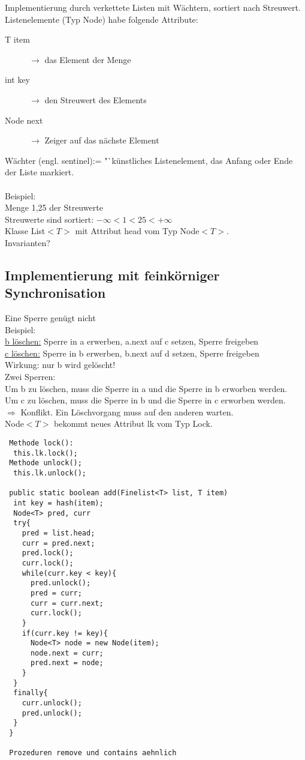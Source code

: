 \documentclass[a4paper,12pt]{scrartcl}
\begin{document}
Implementierung durch verkettete Listen mit Wächtern, sortiert nach Streuwert.\\
Listenelemente (Typ Node) habe folgende Attribute:
\begin{description}
 \item[T item] $\rightarrow$ das Element der Menge
 \item[int key] $\rightarrow$ den Streuwert des Elements
 \item[Node next] $\rightarrow$ Zeiger auf das nächste Element
\end{description}

Wächter (engl. sentinel):= "`künstliches Listenelement, das Anfang oder Ende der Liste markiert.\\
\\
Beispiel:\\
Menge {1,25} der Streuwerte\\
Streuwerte sind sortiert: $-\infty < 1 < 25 < +\infty$\\
Klasse List$<T>$ mit Attribut head vom Typ Node$<T>$.\\
Invarianten?

\subsection{Implementierung mit feinkörniger Synchronisation}

Eine Sperre genügt nicht\\
Beispiel:\\
\underline{b löschen:} Sperre in a erwerben, a.next auf c setzen, Sperre freigeben\\
\underline{c löschen:} Sperre in b erwerben, b.next auf d setzen, Sperre freigeben\\
Wirkung: nur b wird gelöscht!\\
Zwei Sperren:\\
Um b zu löschen, muss die Sperre in a und die Sperre in b erworben werden.\\
Um c zu löschen, muss die Sperre in b und die Sperre in c erworben werden.\\
$\Rightarrow$ Konflikt. Ein Löschvorgang muss auf den anderen warten.\\
Node$<T>$ bekommt neues Attribut lk vom Typ Lock.
\begin{lstlisting}
 Methode lock():
  this.lk.lock();
 Methode unlock();
  this.lk.unlock();
  
 public static boolean add(Finelist<T> list, T item)
  int key = hash(item);
  Node<T> pred, curr
  try{
    pred = list.head;
    curr = pred.next;
    pred.lock();
    curr.lock();
    while(curr.key < key){
      pred.unlock();
      pred = curr;
      curr = curr.next;
      curr.lock();
    }
    if(curr.key != key){
      Node<T> node = new Node(item);
      node.next = curr;
      pred.next = node;
    }
  }
  finally{
    curr.unlock();
    pred.unlock();    
  }
 }
 
 Prozeduren remove und contains aehnlich
 \end{lstlisting}
\end{document}
